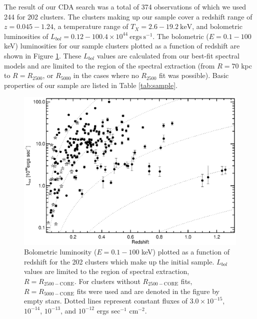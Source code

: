 \documentclass[12pt,preprint]{aastex}
\begin{document}
The result of our CDA search was a total of 374 observations of which
we used 244 for 202 clusters. The clusters making up our sample cover
a redshift range of $z = 0.045-1.24$, a temperature range of
$T_X = 2.6-19.2 \mathrm{~keV}$, and bolometric luminosities of
$L_{bol} = 0.12-100.4\times10^{44} \mathrm{~ergs~s}^{-1}$. The
bolometric ($E = 0.1-100$ keV) luminosities for our sample clusters
plotted as a function of redshift are shown in Figure
\ref{fig:lx_z}. These $L_{bol}$ values are calculated from our
best-fit spectral models and are limited to the region of the spectral
extraction (from $R=70$ kpc to $R=R_{2500}$, or $R_{5000}$ in the
cases where no $R_{2500}$ fit was possible). Basic properties of our
sample are listed in Table \ref{tab:sample}.

\clearpage
\begin{figure}
\begin{center}
\includegraphics*[width=\textwidth, trim=0mm 0mm 0mm 0mm, clip]{f1.eps}
\caption{
Bolometric luminosity ($E = 0.1-100$ keV) plotted as a function of
redshift for the 202 clusters which make up the initial
sample. $L_{bol}$ values are limited to the region of spectral
extraction, $R=R_{2500-\mathrm{CORE}}$. For clusters without
$R_{2500-\mathrm{CORE}}$ fits, $R=R_{5000-\mathrm{CORE}}$ fits were
used and are denoted in the figure by empty stars. Dotted lines
represent constant fluxes of $3.0\times10^{-15}$, $10^{-14}$,
$10^{-13}$, and $10^{-12}$ ergs sec$^{-1}$ cm$^{-2}$.
}
\label{fig:lx_z}
\end{center}
\end{figure}
\clearpage
\end{document}
